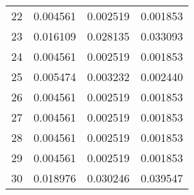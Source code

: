 \begin{table}[]
\begin{tabular}{llll}
22       & 0.004561          & 0.002519           & 0.001853           \\
23       & 0.016109          & 0.028135           & 0.033093           \\
24       & 0.004561          & 0.002519           & 0.001853           \\
25       & 0.005474          & 0.003232           & 0.002440           \\
26       & 0.004561          & 0.002519           & 0.001853           \\
27       & 0.004561          & 0.002519           & 0.001853           \\
28       & 0.004561          & 0.002519           & 0.001853           \\
29       & 0.004561          & 0.002519           & 0.001853           \\
30       & 0.018976          & 0.030246           & 0.039547           \\ \hline
\end{tabular}
\end{table}